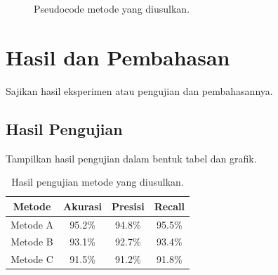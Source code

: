 \documentclass[conference]{IEEEtran}
\begin{document}
\begin{figure}[!t]
\centering
{}
\caption{Pseudocode metode yang diusulkan.}
\label{fig:algoritma}
\end{figure}

\section{Hasil dan Pembahasan}
\label{sec:hasil}

Sajikan hasil eksperimen atau pengujian dan pembahasannya.

\subsection{Hasil Pengujian}
\label{subsec:hasil_pengujian}

Tampilkan hasil pengujian dalam bentuk tabel dan grafik.

\begin{table}[!t]
\centering
\caption{Hasil pengujian metode yang diusulkan.}
\label{tbl:hasil}
\begin{tabular}{|c|c|c|c|}
\hline
\textbf{Metode} & \textbf{Akurasi} & \textbf{Presisi} & \textbf{Recall} \\
\hline
Metode A & 95.2\% & 94.8\% & 95.5\% \\
Metode B & 93.1\% & 92.7\% & 93.4\% \\
Metode C & 91.5\% & 91.2\% & 91.8\% \\
\hline
\end{tabular}
\end{table}
\end{document}
